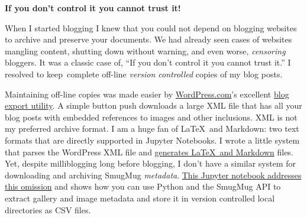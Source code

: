 \medskip
\noindent\textbf{If you don't control it you cannot trust it!}
\medskip

When I started blogging I knew that you could not depend on blogging
websites to archive and preserve your documents. We had already seen
cases of websites mangling content, shutting down without warning, and
even worse, \emph{censoring} bloggers. It was a classic case of, ``If
you don't control it you cannot trust it.'' I resolved to keep~complete
off-line \emph{version controlled} copies of my blog posts.

Maintaining off-line copies was made easier by
\href{https://wordpress.com/}{WordPress.com}'s excellent
\href{https://en.blog.wordpress.com/2006/06/12/xml-import-export/}{blog
export utility}. A simple button push downloads a large XML file that
has all your blog posts with embedded references to images and other
inclusions. XML is not my preferred archive format. I am a huge fan of
\LaTeX\ and Markdown: two text formats that are directly supported in
Jupyter Notebooks. I wrote a little system that parses the WordPress XML
file and
\href{https://analyzethedatanotthedrivel.org/2012/02/11/wordpress-to-latex-with-pandoc-and-j-prerequisites-part-1/}{generates
\LaTeX\ and Markdown} files. Yet, despite milliblogging long before
blogging, I don't have a similar system for downloading and archiving
SmugMug \emph{metadata}.
\href{https://github.com/bakerjd99/smugpyter/blob/master/notebooks/Downloading\%20Smugmug\%20Captions\%20with\%20Jupyter.ipynb}{This
Jupyter notebook addresses this omission} and shows how you can use
Python and the SmugMug API to extract gallery and image metadata and
store it in version controlled local directories as CSV files.



%
 
